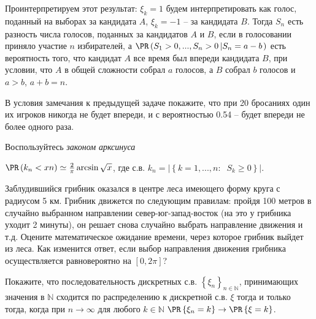 \begin{remark}
Проинтерпретируем этот результат: $\xi_k =1$ будем 
интерпретировать как голос, поданный на выборах за кандидата $A$, 
$\xi _k =-1$ -- за кандидата $B$. Тогда $S_n $ есть разность числа 
голосов, поданных за кандидатов $A$ и $B$, если в голосовании 
приняло участие $n$ избирателей, а $\PR\left( {S_1 >0,...,S_n >0\left| {S_n 
=a-b} \right.} \right)$ есть вероятность того, что кандидат $A$ все 
время был впереди кандидата $B$, при условии, что $A$ в общей 
сложности собрал $a$ голосов, а $B$ собрал $b$ голосов и $a>b$, 
$a+b=n$. 
\end{remark}

\begin{problem}
В условия замечания к предыдущей задаче 
покажите, что при 20 бросаниях один их игроков никогда не будет впереди, и с 
вероятностью 0.54 -- будет впереди не более одного раза.
\end{problem}

\begin{remark} 
Воспользуйтесь \textit{законом арксинуса} 

$\PR\left( {k_n <xn} \right)\simeq 
\frac{2}{\pi }\arcsin \sqrt x $, где с.в. $k_n =\left| {\left\{ 
{k=1,...,n:\;\;S_k \ge 0} \right\}} \right|$.
\end{remark}

\begin{problem}
Заблудившийся грибник оказался в центре леса имеющего форму круга с радиусом 5 км. Грибник движется по следующим правилам: пройдя 100 метров в случайно выбранном направлении север-юг-запад-восток (на это у грибника уходит 2 минуты), он решает снова случайно выбрать направление движения и т.д. Оцените математическое ожидание времени, через которое грибник выйдет из леса. Как изменится ответ, если выбор направления движения грибника осуществляется равновероятно на $[0,2\pi]$? 
\end{problem}

\begin{problem} 
Покажите, что последовательность дискретных с.в. $\left\{ 
{\xi _n } \right\}_{n\in {\mathbb N}} $, принимающих значения в ${\mathbb N}$ 
сходится по распределению к дискретной с.в. $\xi $ тогда и только тогда, 
когда при $n\to \infty $ для любого $k\in {\mathbb N}$ $\PR\left\{ {\xi _n =k} 
\right\}\to \PR\left\{ {\xi =k} \right\}$.
\end{problem}

